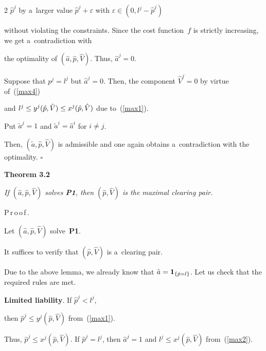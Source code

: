 \begin{multicols}{2}
 $\hat p^j$ by a~larger value $\hat p^j+\varepsilon$ with $\varepsilon\in (0,l^j-\hat p^j)$ 

 without violating the constraints.  Since the cost function~$f$ is strictly increasing, we get a~contradiction with

 the optimality of  $(\hat a, \hat p, \hat V)$. Thus,  $\hat a^j = 0$. 



Suppose that  $p^j = l^j$ but $\hat a^j = 0$. Then, the component $\hat V^j = 0$ by virtue of~(\ref{max4})

 and  $l^j \leq y^j (\hat p,\hat V)\linebreak \leq x^j(\hat p, \hat V)$ due to~(\ref{max1}). 

 Put $\tilde a^j = 1$ and $\tilde a^i = \hat a^i$ for $i \neq j$.

  Then,  $(\tilde a, \hat p, \hat V)$ is admissible and one again obtains a~contradiction with the optimality. \hfill$\square$



\smallskip



\noindent

\textbf{Theorem 3.2}\

\textit{If $(\hat a, \hat p, \hat V)$ solves {\bf P1}, then $(\hat p, \hat V)$ is the maximal clearing pair.}






\smallskip



\noindent

P\,r\,o\,o\,f\,.\ \ 

Let $(\hat a, \hat p, \hat V)$ solve~\textbf{P1}. 

It suffices to verify that $(\hat p, \hat V)$ is a~clearing pair.

 Due to the above lemma, we already know that $\hat{a} = {\bf 1}_{\{\hat p = l\}}$. Let us check that the required rules are met. 



\smallskip



\noindent

\textbf{Limited liability}. If $\hat p^j < l^j$, 

then $\hat p^j \leq y^j(\hat  p,\hat  V)$ from~(\ref{max1}). 

Thus, $\hat p^j \leq x^j(\hat  p,\hat  V)$. If $\hat p^j = l^j$, then $\hat a^j = 1$ and  $l^j \leq  x^j(\hat  p,\hat  V)$ from~(\ref{max2}).




\end{multicols}
